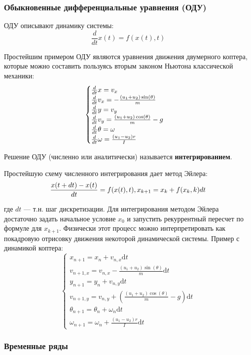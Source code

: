 \documentclass[11pt]{extarticle}
\begin{document}
\subsubsection{Обыкновенные дифференциальные уравнения (ОДУ)}

ОДУ описывают динамику системы:
$$\frac{d}{dt}x(t) = f(x(t), t)$$

Простейшим примером ОДУ являются уравнения движения двумерного коптера, которые можно составить пользуясь вторым законом Ньютона классической механики:
$$
\begin{cases}
    {d\over dt} x= v_{x} \\
    {d\over dt} v_x= - \frac{(u_1 + u_2)\sin(\theta)}{m} \\
    {d\over dt} y= v_{y} \\
    {d\over dt} v_y= \frac{(u_1 + u_2)\cos(\theta)}{m} - g\\
    {d\over dt}\theta = \omega \\
    {d\over dt}\omega = \frac{(u_1 - u_2)r}{I}
\end{cases}
$$

Решение ОДУ (численно или аналитически) называется \textbf{интегрированием}.

Простейшую схему численного интегрирования дает метод Эйлера:
$$
  \frac{x(t+dt) - x(t)}{dt} = f(x(t), t),\\
  x_{k+1} = x_k + f(x_k, k)dt
$$

где $dt$ --- т.н. шаг дискретизации. Для интегрирования методом Эйлера достаточно задать начальное условие $x_0$ и запустить рекуррентный пересчет по формуле для $x_{k+1}$. Физически этот процесс можно интерпретировать как покадровую отрисовку движения некоторой динамической системы. Пример с динамикой коптера:
$$
\begin{cases}
  x_{n+1} = x_{n} + v_{n,x}\text{d}t \\
  v_{n+1,x} = v_{n,x} - \frac{(u_1 + u_2)\sin(\theta)}{m}\text{d}t \\
  y_{n+1} = y_{n} + v_{n,y}\text{d}t \\
  v_{n+1,y} = v_{n,y} + \left(\frac{(u_1 + u_2)\cos(\theta)}{m} - g\right)\text{d}t \\
  \theta_{n+1} = \theta_{n} + \omega_{n}\text{d}t \\
  \omega_{n+1} = \omega_{n} + \frac{(u_1 - u_2)r}{I}\text{d}t
\end{cases}
$$

\subsubsection{Временные ряды}
\end{document}
